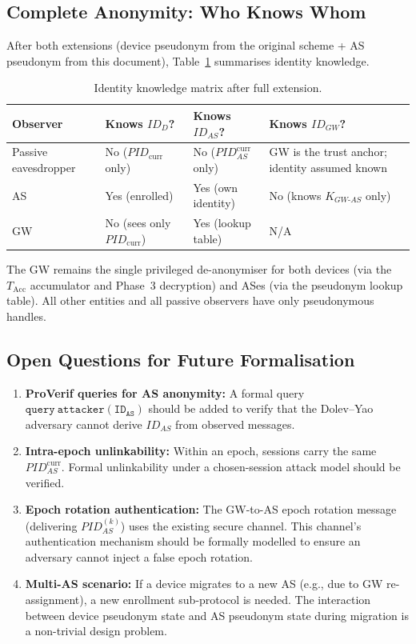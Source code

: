 \documentclass[12pt,a4paper]{article}
\newcommand{\IDd}{\mathit{ID}_D}
\newcommand{\IDas}{\mathit{ID}_{AS}}
\newcommand{\IDgw}{\mathit{ID}_{GW}}
\newcommand{\PIDcurr}{\mathit{PID}_{\mathrm{curr}}}
\newcommand{\PIDas}{\mathit{PID}_{AS}}
\newcommand{\PIDascurr}{\mathit{PID}_{AS}^{\mathrm{curr}}}
\newcommand{\KGWas}{K_{GW\text{-}AS}}
\begin{document}
\subsection{Complete Anonymity: Who Knows Whom}

After both extensions (device pseudonym from the original scheme +
AS pseudonym from this document), Table~\ref{tab:anon-summary}
summarises identity knowledge.

\begin{table}[H]
\caption{Identity knowledge matrix after full extension.}
\label{tab:anon-summary}
\centering
\renewcommand{\arraystretch}{1.35}
\begin{tabularx}{\textwidth}{@{}lXXX@{}}
\toprule
\textbf{Observer} & \textbf{Knows $\IDd$?} & \textbf{Knows $\IDas$?} & \textbf{Knows $\IDgw$?} \\
\midrule
Passive eavesdropper & No ($\PIDcurr$ only) & No ($\PIDascurr$ only) & GW is the trust anchor; identity assumed known \\
AS & Yes (enrolled) & Yes (own identity) & No (knows $\KGWas$ only) \\
GW & No (sees only $\PIDcurr$) & Yes (lookup table) & N/A \\
\bottomrule
\end{tabularx}
\end{table}

The GW remains the single privileged de-anonymiser for both devices
(via the $T_{\mathrm{Acc}}$ accumulator and Phase~3 decryption) and
ASes (via the pseudonym lookup table).  All other entities and all
passive observers have only pseudonymous handles.

\subsection{Open Questions for Future Formalisation}

\begin{enumerate}
  \item \textbf{ProVerif queries for AS anonymity:}
        A formal query
        $\mathtt{query\ attacker(ID_{AS})}$
        should be added to verify that the Dolev--Yao adversary cannot
        derive $\IDas$ from observed messages.
  \item \textbf{Intra-epoch unlinkability:}
        Within an epoch, sessions carry the same $\PIDascurr$.
        Formal unlinkability under a chosen-session attack model
        should be verified.
  \item \textbf{Epoch rotation authentication:}
        The GW-to-AS epoch rotation message (delivering $\PIDas^{(k)}$)
        uses the existing secure channel.  This channel's authentication
        mechanism should be formally modelled to ensure an adversary
        cannot inject a false epoch rotation.
  \item \textbf{Multi-AS scenario:}
        If a device migrates to a new AS (e.g., due to GW re-assignment),
        a new enrollment sub-protocol is needed.  The interaction between
        device pseudonym state and AS pseudonym state during migration
        is a non-trivial design problem.
\end{enumerate}
\end{document}
